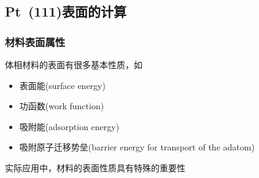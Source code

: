\subsection{\rm{Pt~(111)}表面的计算}\label{Sec:Surface-Pt}
\frame
{
	\frametitle{材料表面属性}
体相材料的表面有很多基本性质，如
\begin{itemize}
	\item 表面能\textrm{(surface energy)}
	\item 功函数\textrm{(work function)}
	\item 吸附能\textrm{(adsorption energy)}
	\item 吸附原子迁移势垒\textrm{(barrier energy for transport of the adatom)}
\end{itemize}
实际应用中，材料的表面性质具有特殊的重要性%
{\fontsize{8.0pt}{5.2pt}\selectfont{
	\begin{itemize}
		\item 表面能是表面形貌学研究(向外/向内弛豫、重构、屈服分析)和裂纹扩散到断裂研究的重要因素
		\item 功函数、吸附能/解吸能和势垒能量是研究表面氧化、薄膜表面和纳米结构的生长和稳定、腐蚀、钝化和催化反应的决定因素%
	\end{itemize}
}}
}
\frame
